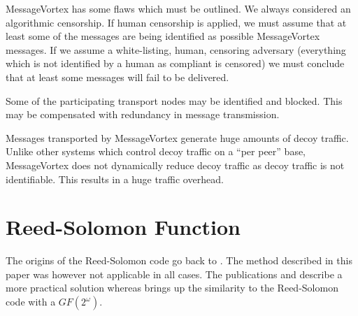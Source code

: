\documentclass[9pt,journal,compsoc]{IEEEtran}
\begin{document}
MessageVortex has some flaws which must be outlined. We always considered an algorithmic censorship. If human censorship is applied, we must assume that at least some of the messages are being identified as possible MessageVortex messages. If we assume a white-listing, human, censoring adversary (everything which is not identified by a human as compliant is censored) we must conclude that at least some messages will fail to be delivered. 

Some of the participating transport nodes may be identified and blocked. This may be compensated with redundancy in message transmission. 

Messages transported by MessageVortex generate huge amounts of decoy traffic. Unlike other systems which control decoy traffic on a ``per peer'' base, MessageVortex does not dynamically reduce decoy traffic as decoy traffic is not identifiable. This results in a huge traffic overhead.



%

\newpage
\appendices

\section{Reed-Solomon Function\label{sec:reedSolomon}}
The origins of the Reed-Solomon code go back to \cite{reed1960polynomial}. The method described in this paper was however not applicable in all cases. The publications \cite{karnin1983secret} and \cite{Rabin:1989:EDI:62044.62050} describe a more practical solution whereas \cite{preparata1989holographic} brings up the similarity to the Reed-Solomon code with a $GF(2^\omega)$. 
\end{document}
